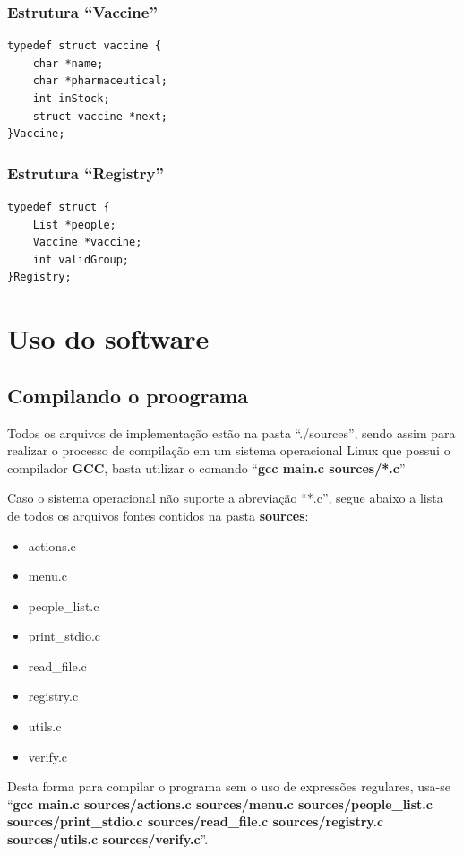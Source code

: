 \documentclass[12pt, a4paper]{article}
\begin{document}
\subsubsection{Estrutura ``Vaccine''}\label{Estrutura ``Vaccine''}
\begin{lstlisting}
typedef struct vaccine {
    char *name;
    char *pharmaceutical;
    int inStock;
    struct vaccine *next;
}Vaccine;
\end{lstlisting}
\subsubsection{Estrutura ``Registry''}\label{Estrutura ``Registry''}
\begin{lstlisting}
typedef struct {
    List *people;
    Vaccine *vaccine;
    int validGroup;
}Registry;
\end{lstlisting}
\cleardoublepage
\section{Uso do software}\label{Uso do software}
\subsection{Compilando o proograma}\label{Compilando o proograma}
Todos os arquivos de implementação estão na pasta ``./sources'', sendo assim para realizar o processo de compilação em um sistema operacional Linux que possui o compilador \textbf{GCC}, basta utilizar o comando ``\textbf{gcc main.c sources/*.c}''

Caso o sistema operacional não suporte a abreviação ``*.c'', segue abaixo a lista de todos os arquivos fontes contidos na pasta \textbf{sources}:
\begin{itemize}
    \item actions.c
    \item menu.c
    \item people\_list.c
    \item print\_stdio.c
    \item read\_file.c
    \item registry.c
    \item utils.c
    \item verify.c
\end{itemize}

Desta forma para compilar o programa sem o uso de expressões regulares, usa-se ``\textbf{gcc main.c sources/actions.c sources/menu.c sources/people\_list.c sources/print\_stdio.c sources/read\_file.c sources/registry.c sources/utils.c sources/verify.c}''.
\end{document}
